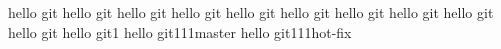 hello git
hello git
hello git
hello git
hello git
hello git
hello git
hello git
hello git
hello git
hello git1
hello git111master
hello git111hot-fix

